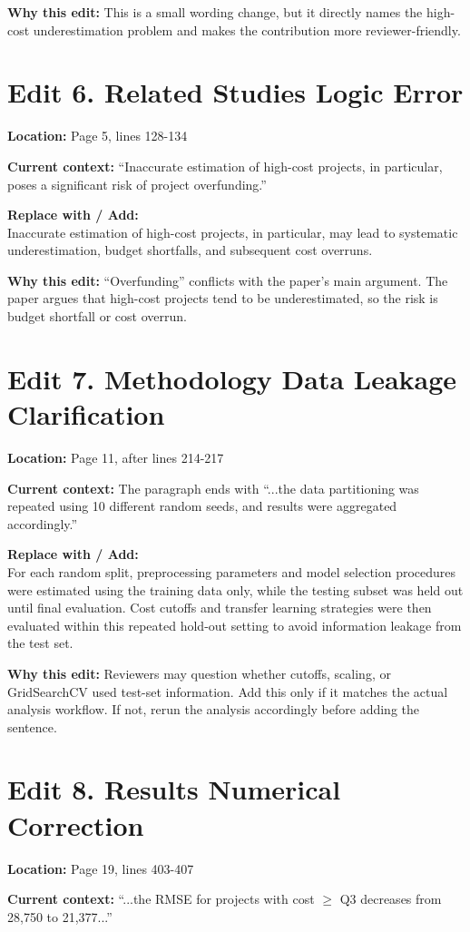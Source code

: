 \documentclass[11pt]{article}
\newcommand{\loc}[1]{\textbf{Location:} #1}
\newcommand{\current}[1]{\textbf{Current context:} #1}
\newcommand{\replacewith}[1]{\textbf{Replace with / Add:}\\{\color{blue}#1}}
\newcommand{\why}[1]{\textbf{Why this edit:} #1}
\begin{document}
\why{This is a small wording change, but it directly names the high-cost underestimation problem and makes the contribution more reviewer-friendly.}

\section*{Edit 6. Related Studies Logic Error}
\loc{Page 5, lines 128-134}

\current{``Inaccurate estimation of high-cost projects, in particular, poses a significant risk of project overfunding.''}

\replacewith{Inaccurate estimation of high-cost projects, in particular, may lead to systematic underestimation, budget shortfalls, and subsequent cost overruns.}

\why{``Overfunding'' conflicts with the paper's main argument. The paper argues that high-cost projects tend to be underestimated, so the risk is budget shortfall or cost overrun.}

\section*{Edit 7. Methodology Data Leakage Clarification}
\loc{Page 11, after lines 214-217}

\current{The paragraph ends with ``...the data partitioning was repeated using 10 different random seeds, and results were aggregated accordingly.''}

\replacewith{For each random split, preprocessing parameters and model selection procedures were estimated using the training data only, while the testing subset was held out until final evaluation. Cost cutoffs and transfer learning strategies were then evaluated within this repeated hold-out setting to avoid information leakage from the test set.}

\why{Reviewers may question whether cutoffs, scaling, or GridSearchCV used test-set information. Add this only if it matches the actual analysis workflow. If not, rerun the analysis accordingly before adding the sentence.}

\section*{Edit 8. Results Numerical Correction}
\loc{Page 19, lines 403-407}

\current{``...the RMSE for projects with cost $\geq$ Q3 decreases from 28,750 to 21,377...''}
\end{document}
